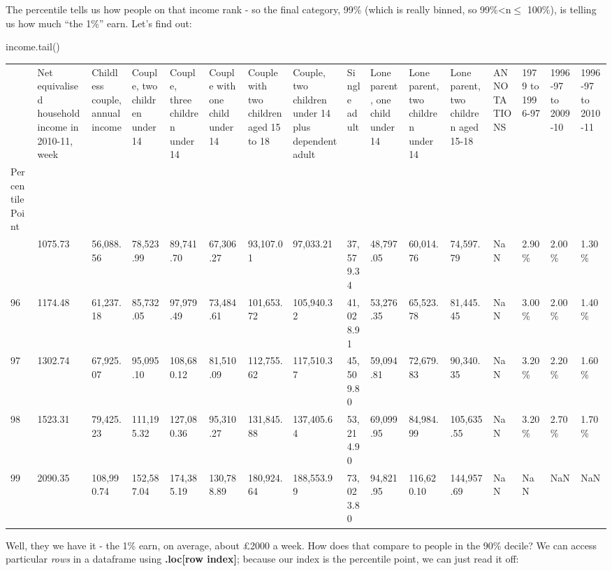 \documentclass[
  letterpaper,
  DIV=11,
  numbers=noendperiod]{scrreprt}
\newenvironment{Shaded}{\begin{snugshade}}{\end{snugshade}}
\newcommand{\NormalTok}[1]{\textcolor[rgb]{0.00,0.23,0.31}{#1}}
\begin{document}
The percentile tells us how people on that income rank - so the final
category, 99\% (which is really binned, so 99\%\textless n\(\leq\)
100\%), is telling us how much ``the 1\%'' earn. Let's find out:

\begin{Shaded}
\begin{Highlighting}[]
\NormalTok{income.tail()}
\end{Highlighting}
\end{Shaded}

\begin{longtable}[]{@{}llllllllllllllll@{}}
\toprule\noalign{}
& Net equivalised household income in 2010-11, week & Childless couple,
annual income & Couple, two children under 14 & Couple, three children
under 14 & Couple with one child under 14 & Couple with two children
aged 15 to 18 & Couple, two children under 14 plus dependent adult &
Single adult & Lone parent, one child under 14 & Lone parent, two
children under 14 & Lone parent, two children aged 15-18 & ANNOTATIONS &
1979 to 1996-97 & 1996-97 to 2009-10 & 1996-97 to 2010-11 \\
Percentile Point & & & & & & & & & & & & & & & \\
\midrule\noalign{}
\endhead
\bottomrule\noalign{}
\endlastfoot
95 & 1075.73 & 56,088.56 & 78,523.99 & 89,741.70 & 67,306.27 & 93,107.01
& 97,033.21 & 37,579.34 & 48,797.05 & 60,014.76 & 74,597.79 & NaN &
2.90\% & 2.00\% & 1.30\% \\
96 & 1174.48 & 61,237.18 & 85,732.05 & 97,979.49 & 73,484.61 &
101,653.72 & 105,940.32 & 41,028.91 & 53,276.35 & 65,523.78 & 81,445.45
& NaN & 3.00\% & 2.00\% & 1.40\% \\
97 & 1302.74 & 67,925.07 & 95,095.10 & 108,680.12 & 81,510.09 &
112,755.62 & 117,510.37 & 45,509.80 & 59,094.81 & 72,679.83 & 90,340.35
& NaN & 3.20\% & 2.20\% & 1.60\% \\
98 & 1523.31 & 79,425.23 & 111,195.32 & 127,080.36 & 95,310.27 &
131,845.88 & 137,405.64 & 53,214.90 & 69,099.95 & 84,984.99 & 105,635.55
& NaN & 3.20\% & 2.70\% & 1.70\% \\
99 & 2090.35 & 108,990.74 & 152,587.04 & 174,385.19 & 130,788.89 &
180,924.64 & 188,553.99 & 73,023.80 & 94,821.95 & 116,620.10 &
144,957.69 & NaN & NaN & NaN & NaN \\
\end{longtable}

Well, they we have it - the 1\% earn, on average, about £2000 a week.
How does that compare to people in the 90\% decile? We can access
particular \emph{rows} in a dataframe using \textbf{.loc{[}row
index{]}}; because our index is the percentile point, we can just read
it off:
\end{document}
